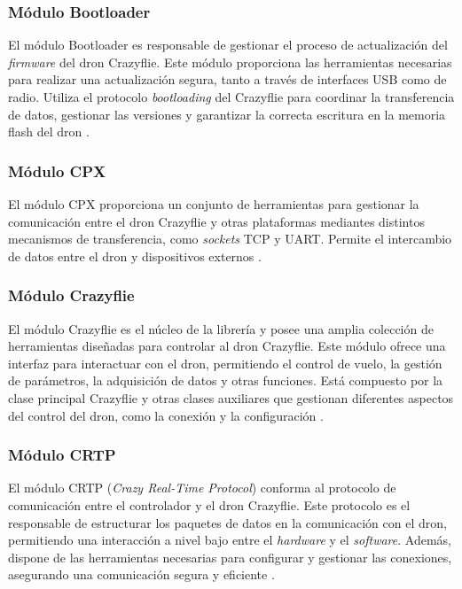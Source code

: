 \subsubsection{Módulo Bootloader}
El módulo Bootloader es responsable de gestionar el proceso de actualización del \textit{firmware} del dron Crazyflie. Este módulo proporciona las herramientas necesarias para realizar una actualización segura, tanto a través de interfaces USB como de radio. Utiliza el protocolo \textit{bootloading} del Crazyflie para coordinar la transferencia de datos, gestionar las versiones y garantizar la correcta escritura en la memoria flash del dron \cite{Bootloader}. 

\subsubsection{Módulo CPX}
El módulo CPX proporciona un conjunto de herramientas para gestionar la comunicación entre el dron Crazyflie y otras plataformas mediantes distintos mecanismos de transferencia, como \textit{sockets} TCP y UART. Permite el intercambio de datos entre el dron y dispositivos externos \cite{CPX}.

\subsubsection{Módulo Crazyflie} 
El módulo Crazyflie es el núcleo de la librería y posee una amplia colección de herramientas diseñadas para controlar al dron Crazyflie. Este módulo ofrece una interfaz para interactuar con el dron, permitiendo el control de vuelo, la gestión de parámetros, la adquisición de datos y otras funciones. Está compuesto por la clase principal Crazyflie y otras clases auxiliares que gestionan diferentes aspectos del control del dron, como la conexión y la configuración \cite{Crazyflie_module}.

\subsubsection{Módulo CRTP}
El módulo CRTP (\textit{Crazy Real-Time Protocol}) conforma al protocolo de comunicación entre el controlador y el dron Crazyflie. Este protocolo es el responsable de estructurar los paquetes de datos en la comunicación con el dron, permitiendo una interacción a nivel bajo entre el \textit{hardware} y el \textit{software}. Además, dispone de las herramientas necesarias para configurar y gestionar las conexiones, asegurando una comunicación segura y eficiente \cite{CRTP}.

